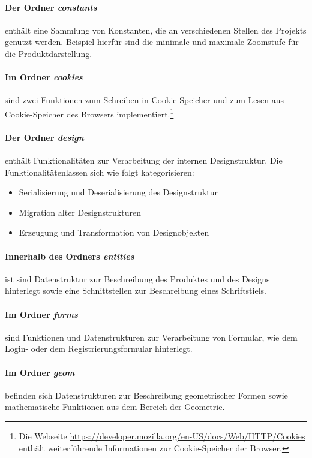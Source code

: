 \paragraph{Der Ordner \emph{constants}} enthält eine Sammlung von Konstanten, die an verschiedenen Stellen des Projekts genutzt werden. Beispiel hierfür sind die minimale und maximale Zoomstufe für die Produktdarstellung. 

\paragraph{Im Ordner \emph{cookies}} sind zwei Funktionen zum Schreiben in Cookie-Speicher und zum Lesen aus Cookie-Speicher des Browsers implementiert.\footnote{Die Webseite \url{https://developer.mozilla.org/en-US/docs/Web/HTTP/Cookies} enthält weiterführende Informationen zur Cookie-Speicher der Browser.}  

\paragraph{Der Ordner \emph{design}} enthält Funktionalitäten zur Verarbeitung der internen Designstruktur.
Die Funktionalitätenlassen sich wie folgt kategorisieren:
\begin{itemize}
    \item Serialisierung und Deserialisierung des Designstruktur
    \item Migration alter Designstrukturen
    \item Erzeugung und Transformation von Designobjekten
\end{itemize}

\paragraph{Innerhalb des Ordners \emph{entities}} ist sind Datenstruktur zur Beschreibung des Produktes und des Designs hinterlegt sowie eine Schnittstellen zur Beschreibung eines Schriftstiels.  

\paragraph{Im Ordner \emph{forms}} sind Funktionen und Datenstrukturen zur Verarbeitung von Formular, wie dem Login- oder dem Registrierungsformular hinterlegt.

\paragraph{Im Ordner \emph{geom}} befinden sich Datenstrukturen zur Beschreibung geometrischer Formen sowie mathematische Funktionen aus dem Bereich der Geometrie.

